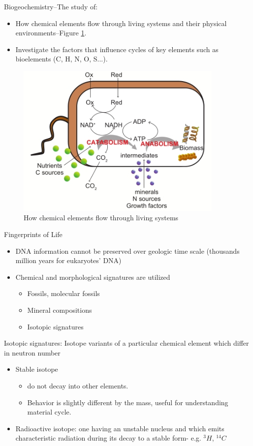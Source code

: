 \documentclass[]{article}
\begin{document}
Biogeochemistry--The study of:
\begin{itemize}
	\item How chemical elements flow through living systems and their physical environments--Figure \ref{fig:Biogeochemistry}\cite{linares-pasten_2018}.
	\item Investigate the factors that influence cycles of key 	elements such as bioelements (C, H, N, O, S...).
	
\end{itemize}

\begin{figure}[H]
	\caption{How chemical elements flow through living systems}\label{fig:Biogeochemistry}
	\includegraphics[width=0.9\textwidth]{Biogeochemistry}
\end{figure}

Fingerprints of Life
\begin{itemize}
	\item  DNA information cannot be preserved over geologic time
	scale (thousands ~ million years for eukaryotes' DNA)
	\item Chemical and morphological signatures are utilized
	\begin{itemize}
		\item  Fossils, molecular fossils
		\item Mineral compositions
		\item Isotopic signatures
	\end{itemize}
\end{itemize}

Isotopic signatures: Isotope variants of a particular chemical element
which differ in neutron number
\begin{itemize}
	\item  Stable isotope
	\begin{itemize}
		\item do not decay into other
		elements.
		\item Behavior is slightly different by the
		mass, useful for understanding
		material cycle.
	\end{itemize}
	\item Radioactive isotope: one having an unstable nucleus and
	which emits characteristic radiation during
	its decay to a stable form- e.g. $^3H$, $^14C$
\end{itemize}
\end{document}
